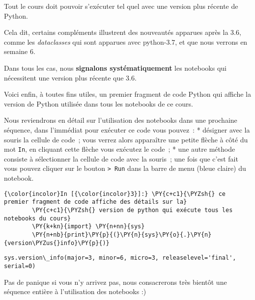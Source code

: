    Tout le cours doit pouvoir s'exécuter tel quel avec une version plus
récente de Python.

Cela dit, certains compléments illustrent des nouveautés apparues après
la 3.6, comme les \emph{dataclasses} qui sont apparues avec python-3.7,
et que nous verrons en semaine 6.

Dans tous les cas, nous \textbf{signalons systématiquement} les
notebooks qui nécessitent une version plus récente que 3.6.

    Voici enfin, à toutes fins utiles, un premier fragment de code Python
qui affiche la version de Python utilisée dans tous les notebooks de ce
cours.

Nous reviendrons en détail sur l'utilisation des notebooks dans une
prochaine séquence, dans l'immédiat pour exécuter ce code vous pouvez~:
* désigner avec la souris la cellule de code~; vous verrez alors
apparaître une petite flèche à côté du mot \texttt{In}, en cliquant
cette flèche vous exécutez le code~; * une autre méthode consiste à
sélectionner la cellule de code avec la souris~; une fois que c'est fait
vous pouvez cliquer sur le bouton \texttt{\textgreater{}\textbar{}\ Run}
dans la barre de menu (bleue claire) du notebook.

    \begin{Verbatim}[commandchars=\\\{\}]
{\color{incolor}In [{\color{incolor}3}]:} \PY{c+c1}{\PYZsh{} ce premier fragment de code affiche des détails sur la}
        \PY{c+c1}{\PYZsh{} version de python qui exécute tous les notebooks du cours}
        \PY{k+kn}{import} \PY{n+nn}{sys}
        \PY{n+nb}{print}\PY{p}{(}\PY{n}{sys}\PY{o}{.}\PY{n}{version\PYZus{}info}\PY{p}{)}
\end{Verbatim}


    \begin{Verbatim}[commandchars=\\\{\}]
sys.version\_info(major=3, minor=6, micro=3, releaselevel='final', serial=0)

    \end{Verbatim}

    Pas de panique si vous n'y arrivez pas, nous consacrerons très bientôt
une séquence entière à l'utilisation des notebooks :)